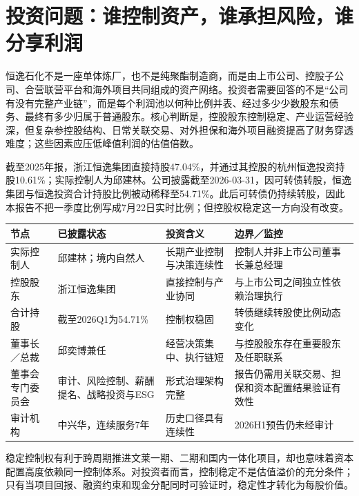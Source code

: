 \section{投资问题：谁控制资产，谁承担风险，谁分享利润}

恒逸石化不是一座单体炼厂，也不是纯聚酯制造商，而是由上市公司、控股子公司、合营联营平台和海外项目共同组成的资产网络。投资者需要回答的不是“公司有没有完整产业链”，而是每个利润池以何种比例并表、经过多少少数股东和债务、最终有多少归属于普通股东。核心判断是，控股股东控制稳定、产业运营经验深，但复杂参控股结构、日常关联交易、对外担保和海外项目融资提高了财务穿透难度；这些因素应压低峰值利润的估值倍数。

截至2025年报，浙江恒逸集团直接持股47.04\%，并通过其控股的杭州恒逸投资持股10.61\%；实际控制人为邱建林。公司披露截至2026-03-31，因可转债转股，恒逸集团与恒逸投资合计持股比例被动稀释至54.71\%。此后可转债仍持续转股，因此本报告不把一季度比例写成7月22日实时比例；但控股权稳定这一方向没有改变。

\begin{exhibitbox}[控制权与主要治理节点]
\noindent\begin{tabularx}{\textwidth}{L{3.4cm}L{2.6cm}L{2.6cm}X}
\toprule
\textbf{节点} & \textbf{已披露状态} & \textbf{投资含义} & \textbf{边界／监控} \\
\midrule
实际控制人 & 邱建林；境内自然人 & 长期产业控制与决策连续性 & 控制人并非上市公司董事长兼总经理 \\
控股股东 & 浙江恒逸集团 & 直接控制与产业协同 & 与上市公司之间独立性依赖治理执行 \\
合计持股 & 截至2026Q1为54.71\% & 控制权稳固 & 转债继续转股使比例动态变化 \\
董事长／总裁 & 邱奕博兼任 & 经营决策集中、执行链短 & 与控股股东存在重要股东及任职联系 \\
董事会专门委员会 & 审计、风险控制、薪酬提名、战略投资与ESG & 形式治理架构完整 & 报告仍需用关联交易、担保和资本配置结果验证有效性 \\
审计机构 & 中兴华，连续服务7年 & 历史口径具有连续性 & 2026H1预告仍未经审计 \\
\bottomrule
\end{tabularx}
\end{exhibitbox}

稳定控制权有利于跨周期推进文莱一期、二期和国内一体化项目，却也意味着资本配置高度依赖同一控制体系。对投资者而言，控制稳定不是估值溢价的充分条件；只有当项目回报、融资约束和现金分配同时可验证时，稳定性才转化为每股价值。

